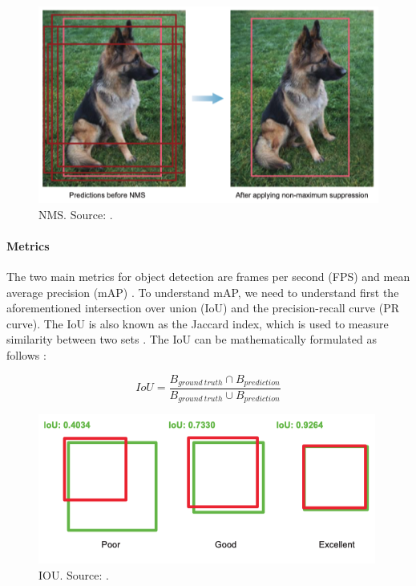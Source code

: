 \documentclass[a4paper, 11pt, oneside]{article}
\begin{document}
\begin{figure}[ht]
  \begin{center}
    \includegraphics[width=.8\textwidth]{nms.png}
  \end{center}
  \caption{NMS. Source: \cite{elgendy2020deep}.}
\end{figure}

\paragraph{Metrics}

The two main metrics for object detection are frames per second (FPS) and mean average precision (mAP)
\cite{elgendy2020deep, liu2020deep, geron2019hands, planche2019hands}. To understand mAP, we need to understand first
the aforementioned intersection over union (IoU) and the precision-recall curve (PR curve). The IoU is also known as
the Jaccard index, which is used to measure similarity between two sets \cite{planche2019hands}. The IoU can be
mathematically formulated as follows \cite{elgendy2020deep, planche2019hands}:

$$IoU = \frac{B_{ground \ truth} \cap B_{prediction}}{B_{ground \ truth} \cup B_{prediction}}$$

\begin{figure}[ht]
  \begin{center}
    \includegraphics[width=.6\textwidth]{iou.png}
  \end{center}
  \caption{IOU. Source: \cite{elgendy2020deep}.}
\end{figure}
\end{document}

